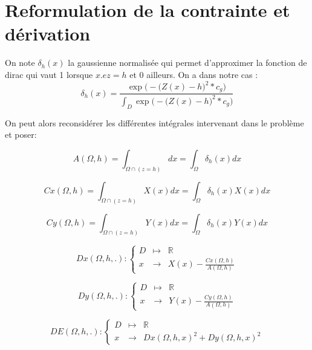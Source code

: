 \documentclass[11pt,a4paper]{article}
\begin{document}
\section*{Reformulation de la contrainte et dérivation}
On note $\delta_{h}(x)$ la gaussienne normalisée qui permet d'approximer la fonction de dirac qui vaut 1 lorsque $x.ez=h$ et 0 ailleurs. On a dans notre cas :
\begin{equation}
\label{eq:gaussienne}
\delta_{h}(x)=\frac{\exp \Big(-\big(Z(x)-h\big)^2*c_{g}\Big)}{\int_D \exp \Big(-\big(Z(x)-h\big)^2*c_{g}\Big)}
\end{equation}

On peut alors reconsidérer les différentes intégrales intervenant dans le problème et poser:

\begin{equation}
\label{eq:aire}
A(\Omega,h)=\int_{\Omega\cap(z=h)}dx=\int_{\Omega}\delta_{h}(x)dx
\end{equation}

\begin{equation}
\label{eq:Cx}
Cx(\Omega,h)=\int_{\Omega\cap(z=h)}X(x)dx=\int_{\Omega}\delta_h(x)X(x)dx
\end{equation}

\begin{equation}
\label{eq:Cy}
Cy(\Omega,h)=\int_{\Omega\cap(z=h)}Y(x)dx=\int_{\Omega}\delta_h(x)Y(x)dx
\end{equation}


\begin{equation}
\label{eq:Dx}
Dx(\Omega,h,.):\left\{\begin{array}{lll}
D & \mapsto & \mathbb{R} \\
x & \rightarrow & X(x)-\frac{Cx(\Omega,h)}{A(\Omega,h)}
\end{array}
\right.
\end{equation}

\begin{equation}
\label{eq:Dy}
Dy(\Omega,h,.):\left\{\begin{array}{lll}
D & \mapsto & \mathbb{R} \\
x & \rightarrow & Y(x)-\frac{Cy(\Omega,h)}{A(\Omega,h)}
\end{array}
\right.
\end{equation}

\begin{equation}
\label{eq:DE}
DE(\Omega,h,.):\left\{\begin{array}{lll}
D & \mapsto & \mathbb{R} \\
x & \rightarrow & Dx(\Omega,h,x)^2+Dy(\Omega,h,x)^2
\end{array}
\right.
\end{equation}
\end{document}
